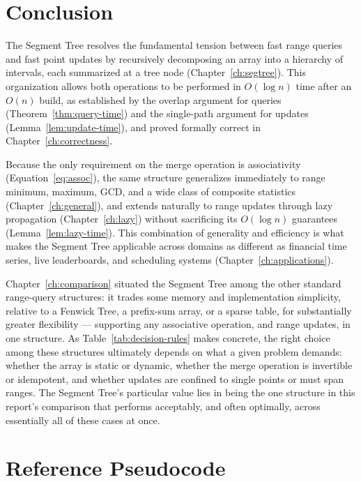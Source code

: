 \documentclass[
  11pt,
  a4paper,
  twoside=false,
  numbers=noenddot,
  headings=big,
  parskip=half,
  toc=bibliography,
  toc=listof,
  bibliography=totoc
]{scrreprt}
\newcommand{\Oh}[1]{O\!\left(#1\right)}
\begin{document}
\chapter{Conclusion}
\label{ch:conclusion}

The Segment Tree resolves the fundamental tension between fast range queries and fast point updates by recursively decomposing an array into a hierarchy of intervals, each summarized at a tree node (Chapter~\ref{ch:segtree}). This organization allows both operations to be performed in $\Oh{\log n}$ time after an $\Oh{n}$ build, as established by the overlap argument for queries (Theorem~\ref{thm:query-time}) and the single-path argument for updates (Lemma~\ref{lem:update-time}), and proved formally correct in Chapter~\ref{ch:correctness}.

Because the only requirement on the merge operation is associativity (Equation~\eqref{eq:assoc}), the same structure generalizes immediately to range minimum, maximum, GCD, and a wide class of composite statistics (Chapter~\ref{ch:general}), and extends naturally to range updates through lazy propagation (Chapter~\ref{ch:lazy}) without sacrificing its $\Oh{\log n}$ guarantees (Lemma~\ref{lem:lazy-time}). This combination of generality and efficiency is what makes the Segment Tree applicable across domains as different as financial time series, live leaderboards, and scheduling systems (Chapter~\ref{ch:applications}).

Chapter~\ref{ch:comparison} situated the Segment Tree among the other standard range-query structures: it trades some memory and implementation simplicity, relative to a Fenwick Tree, a prefix-sum array, or a sparse table, for substantially greater flexibility --- supporting any associative operation, and range updates, in one structure. As Table~\ref{tab:decision-rules} makes concrete, the right choice among these structures ultimately depends on what a given problem demands: whether the array is static or dynamic, whether the merge operation is invertible or idempotent, and whether updates are confined to single points or must span ranges. The Segment Tree's particular value lies in being the one structure in this report's comparison that performs acceptably, and often optimally, across essentially all of these cases at once.

\appendix
\chapter{Reference Pseudocode}
\end{document}
